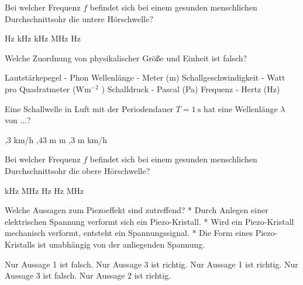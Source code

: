 \documentclass[11pt]{exam}
\begin{document}
\setlength{\voffset}{-0.5in}
\setlength{\headsep}{5pt}

\hspace{2mm}
 \hspace{5mm}
\vspace{4mm}

\begin{questions}

\question Bei welcher Frequenz \( f \) befindet sich bei einem gesunden menschlichen Durchschnittsohr die untere Hörschwelle?

\begin{choices}
	 Hz
	 kHz
	 kHz
	 MHz
	 Hz
\end{choices}

\vspace{3mm}\question Welche Zuordnung von physikalischer Größe und Einheit ist falsch?

\begin{choices}
	\choice Lautstärkepegel - Phon
	\choice Wellenlänge - Meter (m)
	\choice Schallgeschwindigkeit - Watt pro Quadratmeter (\( \mathrm{W m^{-2}} \) )
	\choice Schalldruck - Pascal (Pa)
	\choice Frequenz - Hertz (Hz)
\end{choices}

\vspace{3mm}\question Eine Schallwelle in Luft mit der Periodendauer \( T= \mathrm{1~s} \) hat eine Wellenlänge \( \lambda \) von ...?

\begin{choices}
	,3 km/h
	,43 m
	 m
	,3 m
	 km/h
\end{choices}

\vspace{3mm}\question Bei welcher Frequenz \( f \) befindet sich bei einem gesunden menschlichen Durchschnittsohr die obere Hörschwelle?

\begin{choices}
	 kHz
	 MHz
	 Hz
	 Hz
	 MHz
\end{choices}

\vspace{3mm}\question Welche Aussagen zum Piezoeffekt sind zutreffend?	* Durch Anlegen einer elektrischen Spannung verformt sich ein Piezo-Kristall.	* Wird ein Piezo-Kristall mechanisch verformt, entsteht ein Spannungssignal.	* Die Form eines Piezo-Kristalls ist unabhängig von der anliegenden Spannung.

\begin{choices}
	\choice Nur Aussage 1 ist falsch.
	\choice Nur Aussage 3 ist richtig.
	\choice Nur Aussage 1 ist richtig.
	\choice Nur Aussage 3 ist falsch.
	\choice Nur Aussage 2 ist richtig.
\end{choices}

\vspace{3mm}\end{questions}
\end{document}
